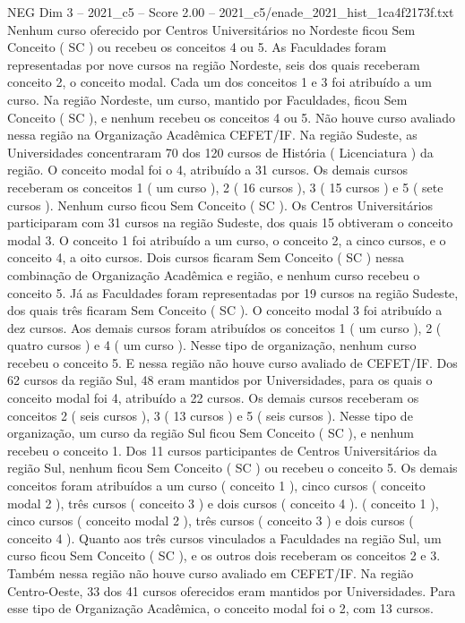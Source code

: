 \begin{textsample}{NEG Dim 3 – 2021\_c5 – Score 2.00 – 2021\_c5/enade\_2021\_hist\_1ca4f2173f.txt}
Nenhum curso oferecido por Centros Universitários no Nordeste ficou Sem Conceito ( SC ) ou recebeu os conceitos 4 ou 5.
As Faculdades foram representadas por nove cursos na região Nordeste, seis dos quais receberam conceito 2, o conceito modal.
Cada um dos conceitos 1 e 3 foi atribuído a um curso.
Na região Nordeste, um curso, mantido por Faculdades, ficou Sem Conceito ( SC ), e nenhum recebeu os conceitos 4 ou 5.
Não houve curso avaliado nessa região na Organização Acadêmica CEFET/IF.
Na região Sudeste, as Universidades concentraram 70 dos 120 cursos de História ( Licenciatura ) da região.
O conceito modal foi o 4, atribuído a 31 cursos.
Os demais cursos receberam os conceitos 1 ( um curso ), 2 ( 16 cursos ), 3 ( 15 cursos ) e 5 ( sete cursos ).
Nenhum curso ficou Sem Conceito ( SC ).
Os Centros Universitários participaram com 31 cursos na região Sudeste, dos quais 15 obtiveram o conceito modal 3.
O conceito 1 foi atribuído a um curso, o conceito 2, a cinco cursos, e o conceito 4, a oito cursos.
Dois cursos ficaram Sem Conceito ( SC ) nessa combinação de Organização Acadêmica e região, e nenhum curso recebeu o conceito 5.
Já as Faculdades foram representadas por 19 cursos na região Sudeste, dos quais três ficaram Sem Conceito ( SC ).
O conceito modal 3 foi atribuído a dez cursos.
Aos demais cursos foram atribuídos os conceitos 1 ( um curso ), 2 ( quatro cursos ) e 4 ( um curso ).
Nesse tipo de organização, nenhum curso recebeu o conceito 5.
E nessa região não houve curso avaliado de CEFET/IF.
Dos 62 cursos da região Sul, 48 eram mantidos por Universidades, para os quais o conceito modal foi 4, atribuído a 22 cursos.
Os demais cursos receberam os conceitos 2 ( seis cursos ), 3 ( 13 cursos ) e 5 ( seis cursos ).
Nesse tipo de organização, um curso da região Sul ficou Sem Conceito ( SC ), e nenhum recebeu o conceito 1.
Dos 11 cursos participantes de Centros Universitários da região Sul, nenhum ficou Sem Conceito ( SC ) ou recebeu o conceito 5.
Os demais conceitos foram atribuídos a um curso ( conceito 1 ), cinco cursos ( conceito modal 2 ), três cursos ( conceito 3 ) e dois cursos ( conceito 4 ). ( conceito 1 ), cinco cursos ( conceito modal 2 ), três cursos ( conceito 3 ) e dois cursos ( conceito 4 ).
Quanto aos três cursos vinculados a Faculdades na região Sul, um curso ficou Sem Conceito ( SC ), e os outros dois receberam os conceitos 2 e 3.
Também nessa região não houve curso avaliado em CEFET/IF.
Na região Centro-Oeste, 33 dos 41 cursos oferecidos eram mantidos por Universidades.
Para esse tipo de Organização Acadêmica, o conceito modal foi o 2, com 13 cursos.

\end{textsample}
